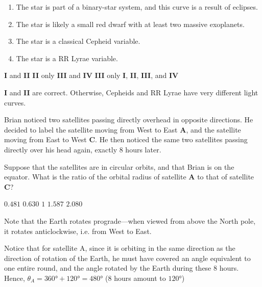 \documentclass[a4paper,11pt]{exam}
\begin{document}
\begin{questions}
	\begin{enumerate}[align=left,labelsep=0pt,leftmargin=0pt,labelsep=3pt,itemindent=23pt,parsep=6pt,label=\textbf{\Roman{*}}.]
		\item The star is part of a binary-star system, and this curve is a result of eclipses.
		\item The star is likely a small red dwarf with at least two massive exoplanets.
		\item The star is a classical Cepheid variable.
		\item The star is a RR Lyrae variable.
	\end{enumerate}
	\begin{choices}
		\correctchoice \textbf{I} and \textbf{II}
		\choice \textbf{II} only
		\choice \textbf{III} and \textbf{IV}
		\choice \textbf{III }only
		\choice \textbf{I}, \textbf{II}, \textbf{III}, and \textbf{IV}
	\end{choices}
	\begin{solution}
		\textbf{I} and \textbf{II} are correct. Otherwise, Cepheids and RR Lyrae have very different light curves.
	\end{solution}

\filbreak
\question
	Brian noticed two satellites passing directly overhead in opposite directions. He decided to label the satellite moving from West to East \textbf{A}, and the satellite moving from East to West \textbf{C}. He then noticed the same two satellites passing directly over his head again, exactly 8 hours later.

	Suppose that the satellites are in circular orbits, and that Brian is on the equator. What is the ratio of the orbital radius of satellite \textbf{A} to that of satellite \textbf{C}?

	\begin{oneparchoices}
		\choice	$ 0.481 $
		\correctchoice	$ 0.630 $
		\choice	$ 1 $
		\choice	$ 1.587 $
		\choice	$ 2.080 $
	\end{oneparchoices}
	\begin{solution}
		Note that the Earth rotates prograde---when viewed from above the North pole, it rotates anticlockwise, i.e. from West to East.

		Notice that for satellite A, since it is orbiting in the same direction as the direction of rotation of the Earth, he must have covered an angle equivalent to one entire round, and the angle rotated by the Earth during these 8 hours. Hence, $ \theta_A=\ang{360}+\ang{120}=\ang{480} $ (8 hours amount to $ \ang{120} $)


\end{solution}
\end{questions}
\end{document}
